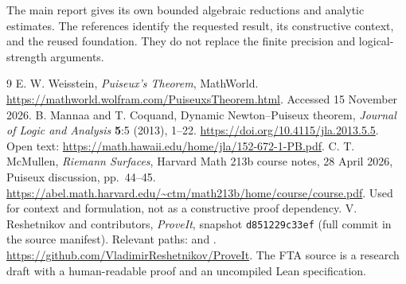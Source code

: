 \documentclass[11pt]{article}
\theoremstyle{definition}
\begin{document}
The main report gives its own bounded algebraic reductions and analytic
estimates. The references identify the requested result, its constructive
context, and the reused foundation. They do not replace the finite
precision and logical-strength arguments.

\begin{thebibliography}{9}
E. W. Weisstein, \emph{Puiseux's Theorem}, MathWorld.
\url{https://mathworld.wolfram.com/PuiseuxsTheorem.html}.
Accessed 15 November 2026.
B. Mannaa and T. Coquand, Dynamic Newton--Puiseux theorem,
\emph{Journal of Logic and Analysis} \textbf{5}:5 (2013), 1--22.
\url{https://doi.org/10.4115/jla.2013.5.5}.
Open text: \url{https://math.hawaii.edu/home/jla/152-672-1-PB.pdf}.
C. T. McMullen, \emph{Riemann Surfaces}, Harvard Math 213b course notes,
28 April 2026, Puiseux discussion, pp.~44--45.
\url{https://abel.math.harvard.edu/~ctm/math213b/home/course/course.pdf}.
Used for context and formulation, not as a constructive proof dependency.
V. Reshetnikov and contributors, \emph{ProveIt}, snapshot
\texttt{d851229c33ef} (full commit in the source manifest).
Relevant paths:
 and
.
\url{https://github.com/VladimirReshetnikov/ProveIt}.
The FTA source is a research draft with a human-readable proof and an
uncompiled Lean specification.
\end{thebibliography}
\end{document}
